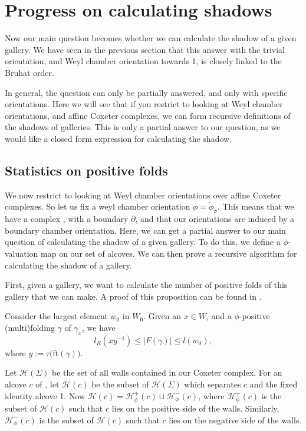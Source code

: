 \documentclass[11pt]{article}
\begin{document}
\section{Progress on calculating shadows}\label{9}

Now our main question becomes whether we can calculate the shadow of a given gallery. We have seen in the previous section that this answer with the trivial orientation, and Weyl chamber orientation towards 1, is closely linked to the Bruhat order. 

In general, the question can only be partially answered, and only with specific orientations. Here we will see that if you restrict to looking at Weyl chamber orientations, and affine Coxeter complexes, we can form recursive definitions of the shadows of galleries. This is only a partial answer to our question, as we would like a closed form expression for calculating the shadow. 

\subsection{Statistics on positive folds}

We now restrict to looking at Weyl chamber orientations over affine Coxeter complexes. So let us fix a weyl chamber orientation $\phi=\tilde{\phi}_\sigma$. This means that we have a complex \sg, with a boundary $\partial$\sg, and that our orientations are induced by a boundary chamber orientation. Here, we can get a partial answer to our main question of calculating the shadow of a given gallery. To do this, we define a $\phi$-valuation map on our set of alcoves. We can then prove a recursive algorithm for calculating the shadow of a gallery.

First, given a gallery, we want to calculate the number of positive folds of this gallery that we can make. A proof of this proposition can be found in \cite[pp.132-133]{SHA}.

\begin{proposition}
    Consider the largest element $w_0$ in $W_0$. Given an $x\in W$, and a $\phi$-positive (multi)folding $\gamma$ of $\gamma_x$, we have
    \[l_R(xy^{-1})\leq |F(\gamma)| \leq l(w_0),\]
    where $y:=\tau($ft$(\gamma))$.
\end{proposition}


\begin{definition}
    Let $\mathcal{H}(\Sigma)$ be the set of all walls contained in our Coxeter complex. For an alcove $c$ of \sg, let $\mathcal{H}(c)$ be the subset of $\mathcal{H}(\Sigma)$ which separates $c$ and the fixed identity alcove 1. Now $\mathcal{H}(c)=\mathcal{H}_{\phi}^+(c)\sqcup \mathcal{H}_{\phi}^-(c)$, where $\mathcal{H}_{\phi}^+(c)$ is the subset of $\mathcal{H}(c)$ such that $c$ lies on the positive side of the walls. Similarly, $\mathcal{H}_{\phi}^-(c)$ is the subset of $\mathcal{H}(c)$ such that $c$ lies on the negative side of the walls.
\end{definition}
\end{document}
